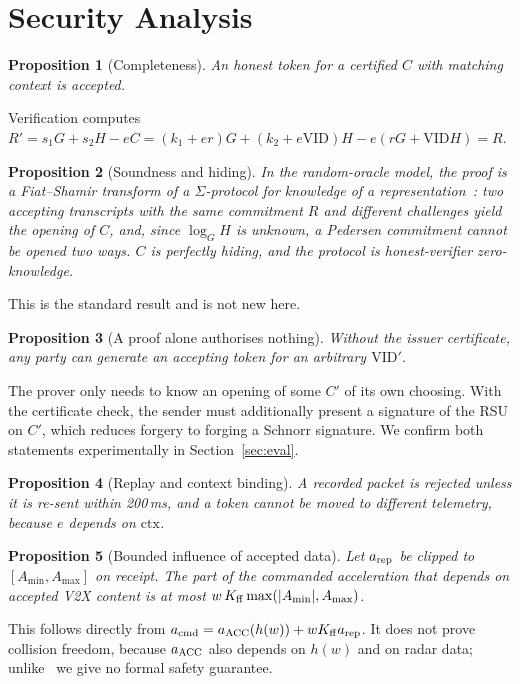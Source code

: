 \documentclass[journal]{IEEEtran}
\newtheorem{proposition}{Proposition}
\begin{document}
\section{Security Analysis}\label{sec:sec}
\begin{proposition}[Completeness]An honest token for a certified $C$ with matching context is accepted.\end{proposition}
Verification computes $R'=s_1G+s_2H-eC=(k_1+er)G+(k_2+e\mathrm{VID})H-e(rG+\mathrm{VID}H)=R$.

\begin{proposition}[Soundness and hiding]In the random-oracle model, the proof is a Fiat--Shamir transform of a $\Sigma$-protocol for knowledge of a representation~\cite{okamoto1992}: two accepting transcripts with the same commitment $R$ and different challenges yield the opening of $C$, and, since $\log_GH$ is unknown, a Pedersen commitment cannot be opened two ways. $C$ is perfectly hiding, and the protocol is honest-verifier zero-knowledge.\end{proposition}
This is the standard result and is not new here.

\begin{proposition}[A proof alone authorises nothing]Without the issuer certificate, any party can generate an accepting token for an arbitrary $\mathrm{VID}'$.\end{proposition}
The prover only needs to know an opening of some $C'$ of its own choosing. With the certificate check, the sender must additionally present a signature of the RSU on $C'$, which reduces forgery to forging a Schnorr signature. We confirm both statements experimentally in Section~\ref{sec:eval}.

\begin{proposition}[Replay and context binding]A recorded packet is rejected unless it is re-sent within 200\,ms, and a token cannot be moved to different telemetry, because $e$ depends on $\mathrm{ctx}$.\end{proposition}

\begin{proposition}[Bounded influence of accepted data]\label{prop:bound}Let $a_{\rm rep}$ be clipped to $[A_{\min},A_{\max}]$ on receipt. The part of the commanded acceleration that depends on accepted V2X content is at most $w\,K_{\rm ff}\max(|A_{\min}|,A_{\max})$.\end{proposition}
This follows directly from $a_{\rm cmd}=a_{\rm ACC}(h(w))+wK_{\rm ff}a_{\rm rep}$. It does not prove collision freedom, because $a_{\rm ACC}$ also depends on $h(w)$ and on radar data; unlike~\cite{lyons2026} we give no formal safety guarantee.
\end{document}
